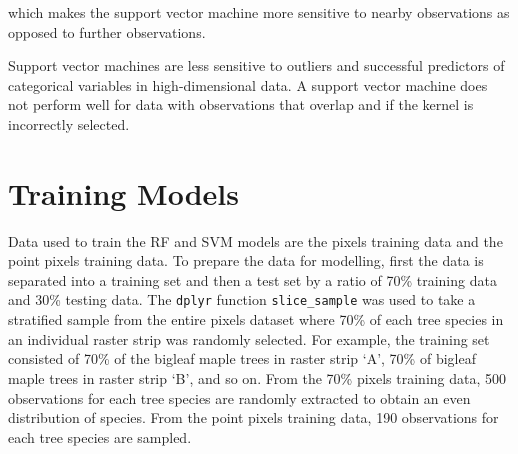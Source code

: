 \documentclass[12pt,twoside]{reedthesis}
\begin{document}
which makes the support vector machine more sensitive to nearby observations as opposed to further observations.

Support vector machines are less sensitive to outliers and successful predictors of categorical variables in high-dimensional data. A support vector machine does not perform well for data with observations that overlap and if the kernel is incorrectly selected.

\hypertarget{training-models}{%
\section{Training Models}\label{training-models}}

Data used to train the RF and SVM models are the pixels training data and the point pixels training data. To prepare the data for modelling, first the data is separated into a training set and then a test set by a ratio of 70\% training data and 30\% testing data. The \texttt{dplyr} function \texttt{slice\_sample} was used to take a stratified sample from the entire pixels dataset where 70\% of each tree species in an individual raster strip was randomly selected. For example, the training set consisted of 70\% of the bigleaf maple trees in raster strip `A', 70\% of bigleaf maple trees in raster strip `B', and so on. From the 70\% pixels training data, 500 observations for each tree species are randomly extracted to obtain an even distribution of species. From the point pixels training data, 190 observations for each tree species are sampled.
\end{document}
